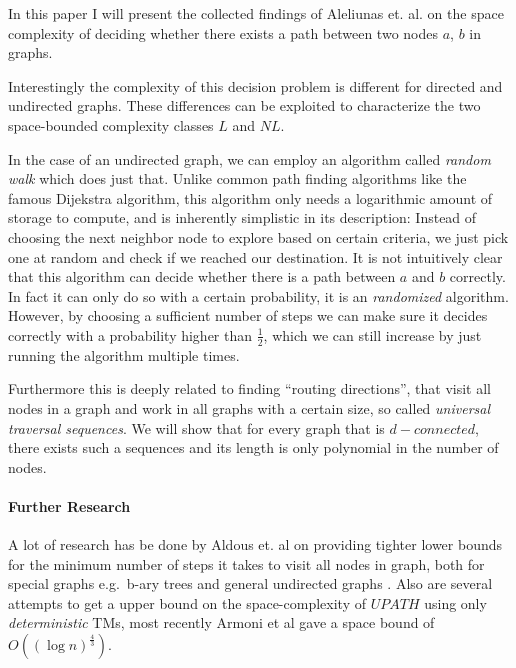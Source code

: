 


\newtheorem{thm}{Theorem}

In this paper I will present the collected findings of Aleliunas et. al.
 on the space complexity of deciding
whether there exists a path between two nodes $a$, $b$ in graphs.

Interestingly the complexity of this decision problem is different for
directed and undirected graphs. These differences can be exploited to
characterize the two space-bounded complexity classes $L$ and $NL$.

In the case of an undirected graph, we can employ an algorithm called
\emph{random walk} which does just that. Unlike common path finding
algorithms like the famous Dijekstra algorithm, this algorithm only
needs a logarithmic amount of storage to compute, and is inherently
simplistic in its description: Instead of choosing the next neighbor
node to explore based on certain criteria, we just pick one at random
and check if we reached our destination. It is not intuitively clear
that this algorithm can decide whether there is a path between $a$ and
$b$ correctly. In fact it can only do so with a certain probability, it
is an \emph{randomized} algorithm. However, by choosing a sufficient
number of steps we can make sure it decides correctly with a probability
higher than $\frac{1}{2}$, which we can still increase by just running
the algorithm multiple times.

Furthermore this is deeply related to finding ``routing directions'',
that visit all nodes in a graph and work in all graphs with a certain
size, so called \emph{universal traversal sequences}. We will show that
for every graph that is $d-connected$, there exists such a sequences and
its length is only polynomial in the number of nodes.

\paragraph{Further Research}\label{further-research}

A lot of research has be done by Aldous et. al on providing tighter
lower bounds for the minimum number of steps it takes to visit all nodes
in graph, both for special graphs e.g.~b-ary trees
 and general undirected graphs
. Also are several attempts to get a upper
bound on the space-complexity of $UPATH$ using only \emph{deterministic}
TMs, most recently Armoni et al  gave a space
bound of $O((\log n)^{\frac{4}{3}})$.


